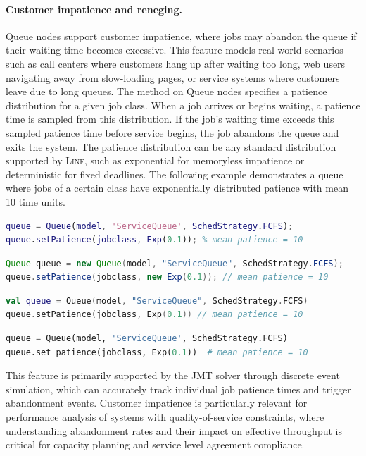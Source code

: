 \paragraph{Customer impatience and reneging.}
Queue nodes support customer impatience, where jobs may abandon the queue if their waiting time becomes excessive. This feature models real-world scenarios such as call centers where customers hang up after waiting too long, web users navigating away from slow-loading pages, or service systems where customers leave due to long queues. The  method on Queue nodes specifies a patience distribution for a given job class. When a job arrives or begins waiting, a patience time is sampled from this distribution. If the job's waiting time exceeds this sampled patience time before service begins, the job abandons the queue and exits the system. The patience distribution can be any standard distribution supported by \textsc{Line}, such as exponential for memoryless impatience or deterministic for fixed deadlines. The following example demonstrates a queue where jobs of a certain class have exponentially distributed patience with mean 10 time units.
\begin{MATLAB}
\begin{lstlisting}[language = matlab]
queue = Queue(model, 'ServiceQueue', SchedStrategy.FCFS);
queue.setPatience(jobclass, Exp(0.1)); % mean patience = 10
\end{lstlisting}
\end{MATLAB}
\begin{JAVA}
\begin{lstlisting}[language = java, basicstyle=\ttfamily\scriptsize]
Queue queue = new Queue(model, "ServiceQueue", SchedStrategy.FCFS);
queue.setPatience(jobclass, new Exp(0.1)); // mean patience = 10
\end{lstlisting}
\end{JAVA}
\begin{KOTLIN}
\begin{lstlisting}[language = kotlin, basicstyle=\ttfamily\scriptsize]
val queue = Queue(model, "ServiceQueue", SchedStrategy.FCFS)
queue.setPatience(jobclass, Exp(0.1)) // mean patience = 10
\end{lstlisting}
\end{KOTLIN}
\begin{PYTHON}
\begin{lstlisting}[language = python]
queue = Queue(model, 'ServiceQueue', SchedStrategy.FCFS)
queue.set_patience(jobclass, Exp(0.1))  # mean patience = 10
\end{lstlisting}
\end{PYTHON}
This feature is primarily supported by the JMT solver through discrete event simulation, which can accurately track individual job patience times and trigger abandonment events. Customer impatience is particularly relevant for performance analysis of systems with quality-of-service constraints, where understanding abandonment rates and their impact on effective throughput is critical for capacity planning and service level agreement compliance.

